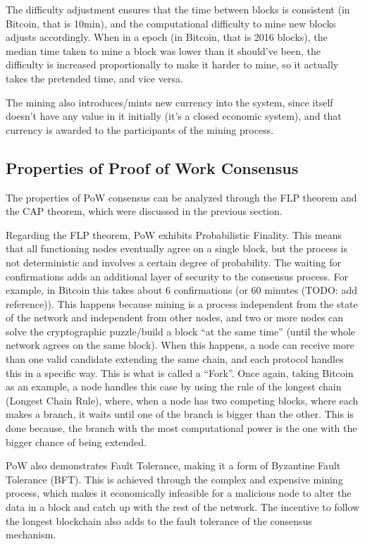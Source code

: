 The difficulty adjustment ensures that the time between blocks is consistent (in Bitcoin, that is 10min), and the computational difficulty to mine new blocks adjusts accordingly. When in a epoch (in Bitcoin, that is 2016 blocks), the median time taken to mine a block was lower than it should've been, the difficulty is increased proportionally to make it harder to mine, so it actually takes the pretended time, and vice versa.

The mining also introduces/mints new currency into the system, since itself doesn't have any value in it initially (it's a closed economic system), and that currency is awarded to the participants of the mining process.


\subsection*{Properties of Proof of Work Consensus}

The properties of PoW consensus can be analyzed through the FLP theorem and the CAP theorem, which were discussed in the previous section.

Regarding the FLP theorem, PoW exhibits Probabilistic Finality. This means that all functioning nodes eventually agree on a single block, but the process is not deterministic and involves a certain degree of probability. The waiting for confirmations adds an additional layer of security to the consensus process. For example, in Bitcoin this takes about 6 confirmations (or 60 minutes (TODO: add reference)). This happens because mining is a process independent from the state of the network and independent from other nodes, and two or more nodes can solve the cryptographic puzzle/build a block ``at the same time'' (until the whole network agrees on the same block).
When this happens, a node can receive more than one valid candidate extending the same chain, and each protocol handles this in a specific way. This is what is called a ``Fork''.
Once again, taking Bitcoin as an example, a node handles this case by using the rule of the longest chain (Longest Chain Rule), where, when a node has two competing blocks, where each makes a branch, it waits until one of the branch is bigger than the other.
This is done because, the branch with the most computational power is the one with the bigger chance of being extended.

PoW also demonstrates Fault Tolerance, making it a form of Byzantine Fault Tolerance (BFT). This is achieved through the complex and expensive mining process, which makes it economically infeasible for a malicious node to alter the data in a block and catch up with the rest of the network. The incentive to follow the longest blockchain also adds to the fault tolerance of the consensus mechanism.

